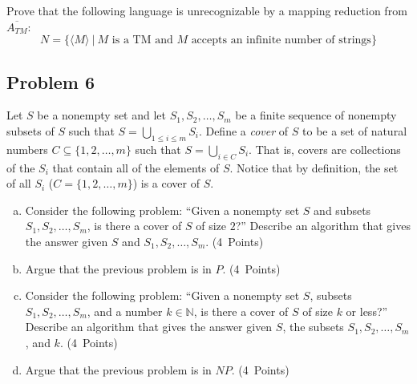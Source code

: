 \documentclass{article}
\begin{document}
Prove that the following language is unrecognizable by a mapping reduction from $\overline{A_{TM}}$:
\[ N = \{\langle M \rangle ~|~ \text{$M$ is a TM and $M$ accepts an infinite number of strings} \} \]


\newpage
\subsection*{Problem 6}


Let $S$ be a nonempty set and let $S_1, S_2, \ldots, S_m$ be a finite sequence of nonempty subsets of $S$ such that $S = \bigcup_{1 \leq i \leq m} S_i$. Define a \emph{cover} of $S$ to be a set of natural numbers $C \subseteq \{1, 2, \ldots, m\}$ such that $S = \bigcup_{i \in C} S_i$. That is, covers are collections of the $S_i$ that contain all of the elements of $S$. Notice that by definition, the set of all $S_i$ ($C = \{1, 2, \ldots, m\}$) is a cover of $S$.

\begin{enumerate}[(a)]
    \item Consider the following problem: ``Given a nonempty set $S$ and subsets $S_1, S_2, \ldots, S_m$, is there a cover of $S$ of size $2$?'' Describe an algorithm that gives the answer given $S$ and $S_1, S_2, \ldots, S_m$. (4~Points)
    \item Argue that the previous problem is in $P$. (4~Points)
    \item Consider the following problem: ``Given a nonempty set $S$, subsets $S_1, S_2, \ldots, S_m$, and a number $k \in \mathbb{N}$, is there a cover of $S$ of size $k$ or less?'' Describe an algorithm that gives the answer given $S$, the subsets $S_1, S_2, \ldots, S_m$, and $k$. (4~Points)
    \item Argue that the previous problem is in $NP$. (4~Points)
\end{enumerate}

\end{document}

